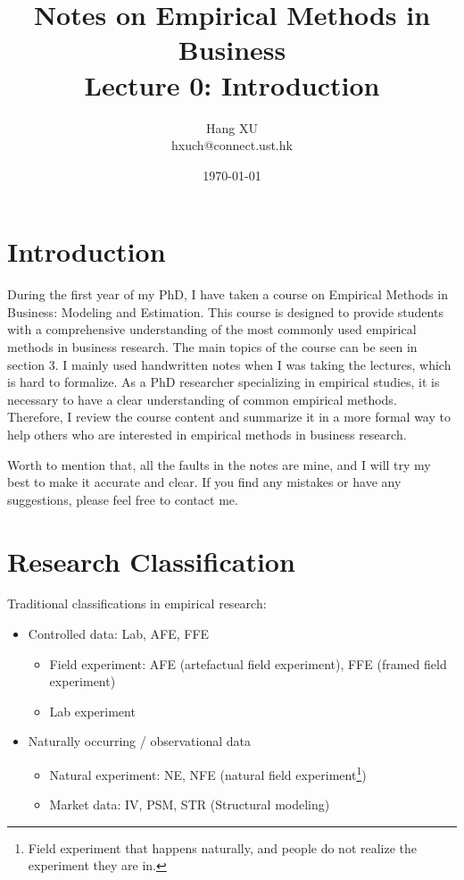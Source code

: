 \documentclass[12pt, a4paper]{article}
\begin{document}

\title{Notes on Empirical Methods in Business \\ Lecture 0: Introduction}
\author{Hang XU \\hxuch@connect.ust.hk}
\date{\today}
\maketitle

\section{Introduction}
During the first year of my PhD, I have taken a course on Empirical Methods in Business: Modeling and Estimation. 
This course is designed to provide students with a comprehensive understanding of the most commonly used empirical methods in business research. The main topics of the course can be seen in section 3. 
I mainly used handwritten notes when I was taking the lectures, which is hard to formalize. As a PhD researcher specializing in empirical studies, it is necessary to have a clear understanding of common empirical methods.
Therefore, I review the course content and summarize it in a more formal way to help others who are interested in empirical methods in business research.

Worth to mention that, all the faults in the notes are mine, and I will try my best to make it accurate and clear. If you find any mistakes or have any suggestions, please feel free to contact me.


\section{Research Classification}

Traditional classifications in empirical research:
\begin{itemize}
    \item Controlled data: Lab, AFE, FFE
    \begin{itemize}
        \item Field experiment: AFE (artefactual field experiment), FFE (framed field experiment)
        \item Lab experiment
    \end{itemize}
    \item Naturally occurring / observational data
    \begin{itemize}
        \item Natural experiment: NE, NFE (natural field experiment\footnote{Field experiment that happens naturally, and people do not realize the experiment they are in.})
        \item Market data: IV, PSM, STR (Structural modeling)
    \end{itemize}
\end{itemize}
\end{document}
